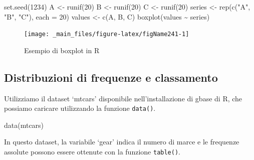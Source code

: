 \documentclass[a4paper,12pt,oneside]{book}
\newenvironment{Shaded}{\begin{snugshade}}{\end{snugshade}}
\newcommand{\DecValTok}[1]{#1}
\newcommand{\SpecialCharTok}[1]{#1}
\newcommand{\StringTok}[1]{#1}
\newcommand{\CommentTok}[1]{#1}
\newcommand{\DocumentationTok}[1]{#1}
\newcommand{\OtherTok}[1]{#1}
\newcommand{\FunctionTok}[1]{#1}
\newcommand{\AttributeTok}[1]{#1}
\newcommand{\NormalTok}[1]{#1}
\begin{document}
\begin{Shaded}
\begin{Highlighting}[]
\FunctionTok{set.seed}\NormalTok{(}\DecValTok{1234}\NormalTok{)}
\NormalTok{A }\OtherTok{\textless{}{-}} \FunctionTok{runif}\NormalTok{(}\DecValTok{20}\NormalTok{)}
\NormalTok{B }\OtherTok{\textless{}{-}} \FunctionTok{runif}\NormalTok{(}\DecValTok{20}\NormalTok{)}
\NormalTok{C }\OtherTok{\textless{}{-}} \FunctionTok{runif}\NormalTok{(}\DecValTok{20}\NormalTok{)}
\NormalTok{series }\OtherTok{\textless{}{-}} \FunctionTok{rep}\NormalTok{(}\FunctionTok{c}\NormalTok{(}\StringTok{"A"}\NormalTok{, }\StringTok{"B"}\NormalTok{, }\StringTok{"C"}\NormalTok{), }\AttributeTok{each =} \DecValTok{20}\NormalTok{)}
\NormalTok{values }\OtherTok{\textless{}{-}} \FunctionTok{c}\NormalTok{(A, B, C)}
\FunctionTok{boxplot}\NormalTok{(values }\SpecialCharTok{\textasciitilde{}}\NormalTok{ series)}
\end{Highlighting}
\end{Shaded}

\begin{figure}

{\centering \texttt{[image: \_main\_files/figure-latex/figName241-1]} 

}

\caption{Esempio di boxplot in R}\label{fig:figName241}
\end{figure}

\hypertarget{distribuzioni-di-frequenze-e-classamento-1}{%
\subsection{Distribuzioni di frequenze e classamento}\label{distribuzioni-di-frequenze-e-classamento-1}}

Utilizziamo il dataset `mtcars' disponibile nell'installazione di gbase di R, che possiamo caricare utilizzando la funzione \texttt{data()}.

\begin{Shaded}
\begin{Highlighting}[]
\FunctionTok{data}\NormalTok{(mtcars)}
\end{Highlighting}
\end{Shaded}

In questo dataset, la variabile `gear' indica il numero di marce e le frequenze assolute possono essere ottenute con la funzione \texttt{table()}.

\begin{Shaded}
\end{Shaded}
\end{document}

